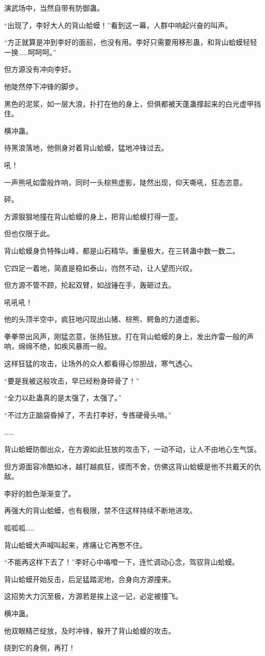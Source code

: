 \begin{this_body}
演武场中，当然自带有防御蛊。

“出现了，李好大人的背山蛤蟆！”看到这一幕，人群中响起兴奋的叫声。

“方正就算是冲到李好的面前，也没有用。李好只需要用移形蛊，和背山蛤蟆轻轻一换……呵呵呵。”

但方源没有冲向李好。

他陡然停下冲锋的脚步。

黑色的泥浆，如一层大浪，扑打在他的身上，但俱都被天蓬蛊撑起来的白光虚甲挡住。

横冲蛊。

待黑浪落地，他侧身对着背山蛤蟆，猛地冲锋过去。

吼！

一声熊吼如雷般炸响，同时一头棕熊虚影，陡然出现，仰天嘶吼，狂态恣意。

砰。

方源狠狠地撞在背山蛤蟆的身上，把背山蛤蟆打得一歪。

但也仅限于此。

背山蛤蟆身负特殊山峰，都是山石精华。重量极大，在三转蛊中数一数二。

它四足一着地，简直是稳如泰山，岿然不动，让人望而兴叹。

但方源不管不顾，抡起双臂，如战锤在手，轰砸过去。

吼吼吼！

他的头顶半空中，疯狂地闪现出山猪、棕熊、鳄鱼的力道虚影。

拳拳带出风声，刚猛恣意，张扬狂放。打在背山蛤蟆的身上，发出炸雷一般的声响，绵绵不绝，如疾风暴雨一般。

这样狂猛的攻击，让场外的众人都看得心惊胆战，寒气透心。

“要是我被这般攻击，早已经粉身碎骨了！”

“全力以赴蛊真的是太强了，太强了。”

“不过方正脑袋昏掉了，不去打李好，专拣硬骨头啃。”

……

背山蛤蟆防御出众，在方源如此狂放的攻击下，一动不动，让人不由地心生气馁。

但方源面容冷酷如冰，越打越疯狂，锲而不舍，仿佛这背山蛤蟆是他不共戴天的仇敌。

李好的脸色渐渐变了。

再强大的背山蛤蟆，也有极限，禁不住这样持续不断地进攻。

呱呱呱……

背山蛤蟆大声喊叫起来，疼痛让它再憋不住。

“不能再这样下去了！”李好心中咯噔一下，连忙调动心念，驾驭背山蛤蟆。

背山蛤蟆开始反击，后足猛踏泥地，合身向方源撞来。

这招势大力沉至极，方源若是挨上这一记，必定被撞飞。

横冲蛊。

他双眼精芒绽放，及时冲锋，躲开了背山蛤蟆的攻击。

绕到它的身侧，再打！

\end{this_body}

